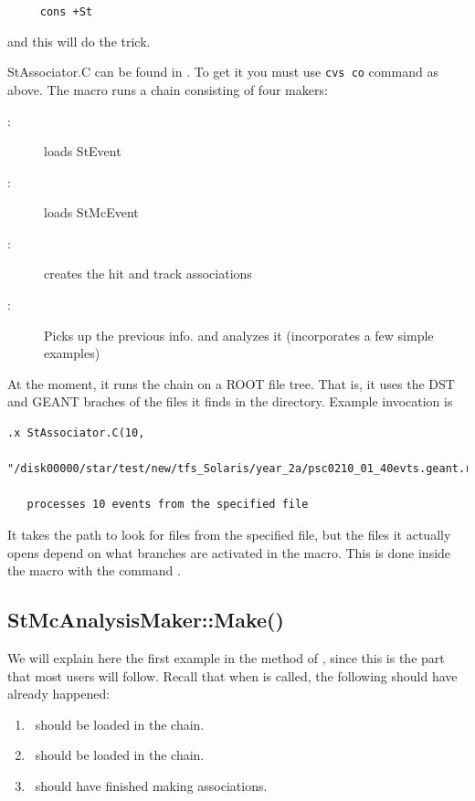 \verb!     cons +St!

and this will do the trick.

StAssociator.C can be found in . %
To get it you must use \verb+cvs co+ command as above. The macro runs a 
chain consisting of four makers:
\begin{description}
\item[:] loads StEvent
\item[:] loads StMcEvent
\item[:] creates the hit and track associations
\item[:] Picks up the previous info. and analyzes it 
    (incorporates a few simple examples)
\end{description}


At the moment, it runs the chain on a ROOT file tree.  That is, it uses the DST
and GEANT braches of the files it finds in the directory.  Example invocation
is
\begin{footnotesize}
\begin{verbatim}
.x StAssociator.C(10,
    "/disk00000/star/test/new/tfs_Solaris/year_2a/psc0210_01_40evts.geant.root")

   processes 10 events from the specified file

\end{verbatim}
\end{footnotesize}

It takes the path to look for files from the specified file, but the files it
actually opens depend on
what branches are activated in the macro.
This is done inside the macro with the command .


\subsection{StMcAnalysisMaker::Make()}
We will explain here the first example in
the  method of , since this is the
part that most users will follow.
Recall that when  is called, the following should have already
happened:
\begin{enumerate}
\item \StEvent\ should be loaded in the chain.
\item \StMcEvent\ should be loaded in the chain.
\item \StAssociationMaker\ should have finished making associations.
\end{enumerate}

